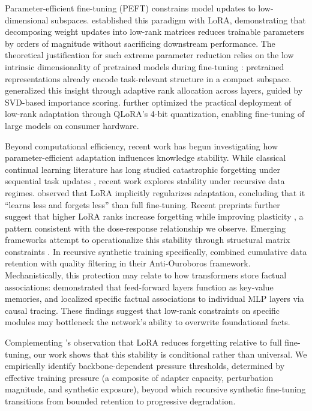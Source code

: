 \documentclass[a4paper,fleqn]{cas-dc}
\begin{document}
Parameter-efficient fine-tuning (PEFT) constrains model updates to
low-dimensional subspaces. \citet{hu2022} established this paradigm with LoRA,
demonstrating that decomposing weight updates into low-rank matrices reduces
trainable parameters by orders of magnitude without sacrificing downstream
performance. The theoretical justification for such extreme parameter reduction
relies on the low intrinsic dimensionality of pretrained models during
fine-tuning \citep{aghajanyan2021}: pretrained representations already encode
task-relevant structure in a compact subspace. \citet{zhang2023adalora}
generalized this insight through adaptive rank allocation across layers, guided
by SVD-based importance scoring. \citet{dettmers2023} further optimized the
practical deployment of low-rank adaptation through QLoRA's 4-bit quantization,
enabling fine-tuning of large models on consumer hardware.

Beyond computational efficiency, recent work has begun investigating how
parameter-efficient adaptation influences knowledge stability. While classical
continual learning literature has long studied catastrophic forgetting under
sequential task updates \citep{kirkpatrick2017,delange2022,shi2024continualllm}, recent work
explores stability under recursive data regimes. \citet{biderman2024} observed
that LoRA implicitly regularizes adaptation, concluding that it ``learns less
and forgets less'' than full fine-tuning. Recent preprints further suggest that
higher LoRA ranks increase forgetting while improving plasticity
\citep{biderman2024incremental,ding2024ranktrade},
a pattern consistent with the dose-response relationship we observe. Emerging
frameworks attempt to operationalize this stability through structural matrix
constraints \citep{fawi2024curlora}. In
recursive synthetic training specifically, \citet{adapala2025} combined
cumulative data retention with quality filtering in their Anti-Ouroboros
framework. Mechanistically, this protection may relate to how transformers
store factual associations: \citet{geva2021} demonstrated that feed-forward
layers function as key-value memories, and \citet{meng2022locating} localized
specific factual associations to individual MLP layers via causal tracing. These
findings suggest that low-rank constraints on specific modules may bottleneck
the network's ability to overwrite foundational facts.

Complementing \citet{biderman2024}'s observation that LoRA reduces forgetting
relative to full fine-tuning, our work shows that this stability is conditional
rather than universal. We empirically identify backbone-dependent pressure
thresholds, determined by effective training pressure (a composite of adapter
capacity, perturbation magnitude, and synthetic exposure), beyond which
recursive synthetic fine-tuning transitions from bounded retention to
progressive degradation.
\end{document}
